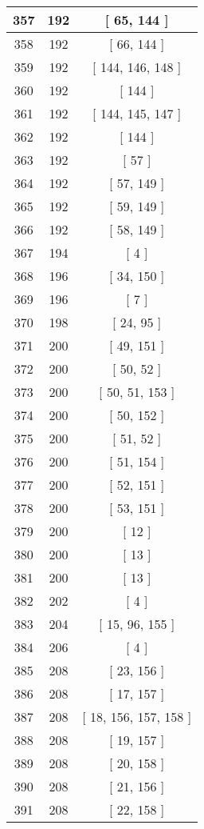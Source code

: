 \begin{center}
\begin{longtable}[H]{|| c c c ||}
\hline
357 & 192 & [ 65, 144 ] \\ 
\hline
358 & 192 & [ 66, 144 ] \\ 
\hline
359 & 192 & [ 144, 146, 148 ] \\ 
\hline
360 & 192 & [ 144 ] \\ 
\hline
361 & 192 & [ 144, 145, 147 ] \\ 
\hline
362 & 192 & [ 144 ] \\ 
\hline
363 & 192 & [ 57 ] \\ 
\hline
364 & 192 & [ 57, 149 ] \\ 
\hline
365 & 192 & [ 59, 149 ] \\ 
\hline
366 & 192 & [ 58, 149 ] \\ 
\hline
367 & 194 & [ 4 ] \\ 
\hline
368 & 196 & [ 34, 150 ] \\ 
\hline
369 & 196 & [ 7 ] \\ 
\hline
370 & 198 & [ 24, 95 ] \\ 
\hline
371 & 200 & [ 49, 151 ] \\ 
\hline
372 & 200 & [ 50, 52 ] \\ 
\hline
373 & 200 & [ 50, 51, 153 ] \\ 
\hline
374 & 200 & [ 50, 152 ] \\ 
\hline
375 & 200 & [ 51, 52 ] \\ 
\hline
376 & 200 & [ 51, 154 ] \\ 
\hline
377 & 200 & [ 52, 151 ] \\ 
\hline
378 & 200 & [ 53, 151 ] \\ 
\hline
379 & 200 & [ 12 ] \\ 
\hline
380 & 200 & [ 13 ] \\ 
\hline
381 & 200 & [ 13 ] \\ 
\hline
382 & 202 & [ 4 ] \\ 
\hline
383 & 204 & [ 15, 96, 155 ] \\ 
\hline
384 & 206 & [ 4 ] \\ 
\hline
385 & 208 & [ 23, 156 ] \\ 
\hline
386 & 208 & [ 17, 157 ] \\ 
\hline
387 & 208 & [ 18, 156, 157, 158 ] \\ 
\hline
388 & 208 & [ 19, 157 ] \\ 
\hline
389 & 208 & [ 20, 158 ] \\ 
\hline
390 & 208 & [ 21, 156 ] \\ 
\hline
391 & 208 & [ 22, 158 ] \\ 

\end{longtable}
\end{center}
